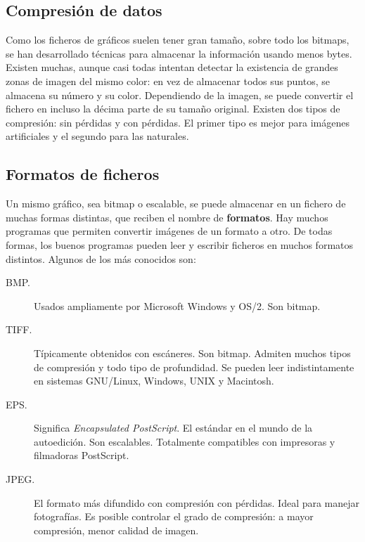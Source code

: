 \subsection{Compresión de datos}

Como los ficheros de gráficos suelen tener gran tamaño, sobre todo los
bitmaps, se han desarrollado técnicas para almacenar la información
usando menos bytes. Existen muchas, aunque casi todas intentan
detectar la existencia de grandes zonas de imagen del mismo color: en
vez de almacenar todos sus puntos, se almacena su número y su
color. Dependiendo de la imagen, se puede convertir el fichero en
incluso la décima parte de su tamaño original. Existen dos tipos de
compresión: sin pérdidas y con pérdidas. El primer tipo es mejor para
imágenes artificiales y el segundo para las naturales.

\subsection{Formatos de ficheros}

Un mismo gráfico, sea bitmap o escalable, se puede almacenar en un
fichero de muchas formas distintas, que reciben el nombre de
\textbf{formatos}. Hay muchos programas que permiten convertir
imágenes de un formato a otro. De todas formas, los buenos programas
pueden leer y escribir ficheros en muchos formatos distintos. Algunos
de los más conocidos son:

\begin{description}
\item[BMP.] Usados ampliamente por Microsoft Windows y OS/2. Son bitmap.

\item[TIFF.] Típicamente obtenidos con escáneres. Son bitmap. Admiten
 muchos tipos de compresión y todo tipo de profundidad. Se pueden leer
 indistintamente en sistemas GNU/Linux, Windows, UNIX y Macintosh.

\item[EPS.] Significa \emph{Encapsulated PostScript}. El estándar en 
el mundo de la autoedición. Son escalables. Totalmente compatibles con 
impresoras y filmadoras PostScript.

\item[JPEG.] El formato más difundido con compresión con pérdidas. 
Ideal para manejar fotografías. Es posible controlar el grado de 
compresión: a mayor compresión, menor calidad de imagen.
\end{description}


